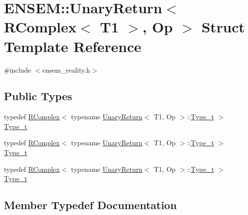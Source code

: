 \hypertarget{structENSEM_1_1UnaryReturn_3_01RComplex_3_01T1_01_4_00_01Op_01_4}{}\section{E\+N\+S\+EM\+:\+:Unary\+Return$<$ R\+Complex$<$ T1 $>$, Op $>$ Struct Template Reference}
\label{structENSEM_1_1UnaryReturn_3_01RComplex_3_01T1_01_4_00_01Op_01_4}


{\ttfamily \#include $<$ensem\+\_\+reality.\+h$>$}

\subsection*{Public Types}
\begin{DoxyCompactItemize}
\item 
typedef \mbox{\hyperlink{classENSEM_1_1RComplex}{R\+Complex}}$<$ typename \mbox{\hyperlink{structENSEM_1_1UnaryReturn}{Unary\+Return}}$<$ T1, Op $>$\+::\mbox{\hyperlink{structENSEM_1_1UnaryReturn_3_01RComplex_3_01T1_01_4_00_01Op_01_4_ac02d831030bfab6627f041d352dbbe95}{Type\+\_\+t}} $>$ \mbox{\hyperlink{structENSEM_1_1UnaryReturn_3_01RComplex_3_01T1_01_4_00_01Op_01_4_ac02d831030bfab6627f041d352dbbe95}{Type\+\_\+t}}
\item 
typedef \mbox{\hyperlink{classENSEM_1_1RComplex}{R\+Complex}}$<$ typename \mbox{\hyperlink{structENSEM_1_1UnaryReturn}{Unary\+Return}}$<$ T1, Op $>$\+::\mbox{\hyperlink{structENSEM_1_1UnaryReturn_3_01RComplex_3_01T1_01_4_00_01Op_01_4_ac02d831030bfab6627f041d352dbbe95}{Type\+\_\+t}} $>$ \mbox{\hyperlink{structENSEM_1_1UnaryReturn_3_01RComplex_3_01T1_01_4_00_01Op_01_4_ac02d831030bfab6627f041d352dbbe95}{Type\+\_\+t}}
\item 
typedef \mbox{\hyperlink{classENSEM_1_1RComplex}{R\+Complex}}$<$ typename \mbox{\hyperlink{structENSEM_1_1UnaryReturn}{Unary\+Return}}$<$ T1, Op $>$\+::\mbox{\hyperlink{structENSEM_1_1UnaryReturn_3_01RComplex_3_01T1_01_4_00_01Op_01_4_ac02d831030bfab6627f041d352dbbe95}{Type\+\_\+t}} $>$ \mbox{\hyperlink{structENSEM_1_1UnaryReturn_3_01RComplex_3_01T1_01_4_00_01Op_01_4_ac02d831030bfab6627f041d352dbbe95}{Type\+\_\+t}}
\end{DoxyCompactItemize}


\subsection{Member Typedef Documentation}
\mbox{\label{structENSEM_1_1UnaryReturn_3_01RComplex_3_01T1_01_4_00_01Op_01_4_ac02d831030bfab6627f041d352dbbe95}} 
